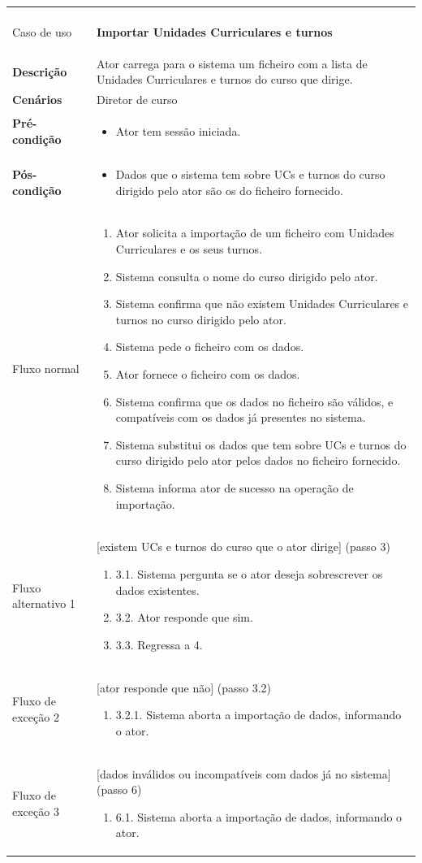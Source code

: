 \documentclass[12pt, a4paper]{article}
\newenvironment{condition}{
    \begin{itemize}[wide=0pt]
        \vspace{-0.2cm}
}{
        \vspace{-0.5cm}
    \end{itemize}
}
\newcommand\flow[1]{
    Fluxo normal &
    \vspace{-0.9cm}
    \singlespacing
    \begin{enumerate}[wide=0pt]
        #1
        \vspace{-0.3cm}
    \end{enumerate} \\ \hline
}
\newcommand\otherflow[3]{
    #1 &
    #2
    \singlespacing
    \begin{enumerate}[wide=0pt]
        #3
        \vspace{-0.3cm}
    \end{enumerate} \\ \hline
}
\newenvironment{usecase}[5]{
    \begin{longtable}{|>{\centering\arraybackslash\bf}m{3cm}|m{13cm}|}
        \multicolumn{2}{c}{\ldots Continua \ldots} \\
        \endfoot
        \endlastfoot

        \hline
        Caso de uso & \textbf{#1} \\

        \hline
        Descrição & #2 \\

        \hline
        Cenários & #3 \\

        \hline
        Pré-condição &
        \vspace{-0.8cm}
        \begin{condition}
            #4
        \end{condition} \\

        \hline
        Pós-condição &
        \vspace{-0.8cm}
        \begin{condition}
            #5
        \end{condition} \\

        \hline
}{
\end{longtable}
}
\begin{document}
\begin{usecase}
    {Importar Unidades Curriculares e turnos}
    {
        Ator carrega para o sistema um ficheiro com a lista de Unidades Curriculares e turnos do
        curso que dirige.
    }
    {Diretor de curso}
    {\item Ator tem sessão iniciada.}
    {
        \item Dados que o sistema tem sobre UCs e turnos do curso dirigido pelo ator são os do
            ficheiro fornecido.
    }

    \flow{
        \item Ator solicita a importação de um ficheiro com Unidades Curriculares e os seus turnos.
        \item Sistema consulta o nome do curso dirigido pelo ator.
        \item Sistema confirma que não existem Unidades Curriculares e turnos no curso dirigido pelo
            ator.
        \item Sistema pede o ficheiro com os dados.
        \item Ator fornece o ficheiro com os dados.
        \item Sistema confirma que os dados no ficheiro são válidos, e compatíveis com os dados já
            presentes no sistema.
        \item Sistema substitui os dados que tem sobre UCs e turnos do curso dirigido pelo ator
            pelos dados no ficheiro fornecido.
        \item Sistema informa ator de sucesso na operação de importação.
    }

    \otherflow{Fluxo alternativo 1}{[existem UCs e turnos do curso que o ator dirige] (passo 3)}{
        \item[3.1.] Sistema pergunta se o ator deseja sobrescrever os dados existentes.
        \item[3.2.] Ator responde que sim.
        \item[3.3.] Regressa a 4.
    }

    \otherflow{Fluxo de exceção 2}{[ator responde que não] (passo 3.2)}{
        \item[3.2.1.] Sistema aborta a importação de dados, informando o ator.
    }

    \otherflow{Fluxo de exceção 3}
        {[dados inválidos ou incompatíveis com dados já no sistema] (passo 6)}{

        \item[6.1.] Sistema aborta a importação de dados, informando o ator.
    }
\end{usecase}
\end{document}

